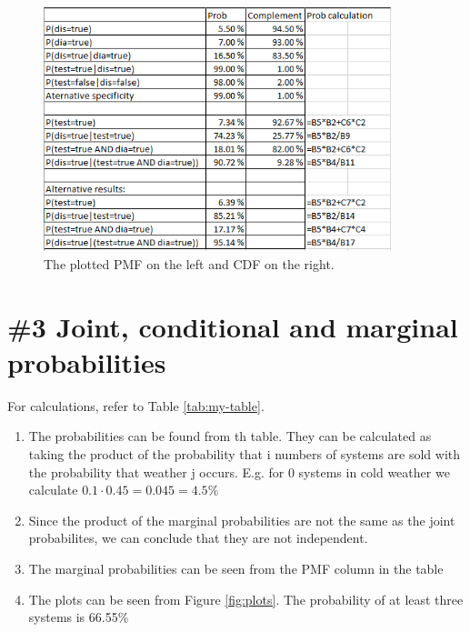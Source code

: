 \documentclass{article}
\begin{document}
\begin{figure}[H]
	\centering
	\includegraphics[width=0.9\textwidth]{calc_2.png}
	\caption{The plotted PMF on the left and CDF on the right.}
	\label{fig:calc_2}
\end{figure}
\section{\#3 Joint, conditional and marginal probabilities}
For calculations, refer to Table \ref{tab:my-table}.

\begin{enumerate}[label=\alph*)]
	\item The probabilities can be found from th table. They can be calculated as taking the product of the probability that i numbers of systems are sold with the probability that weather j occurs. E.g. for 0 systems in cold weather we calculate $0.1 \cdot 0.45=0.045=4.5\%$
	\item Since the product of the marginal probabilities  are not the same as the joint probabilites, we can conclude that they are not independent.
	\item The marginal probabilities can be seen from the PMF column in the table
	\item The plots can be seen from Figure \ref{fig:plots}. The probability of at least three systems is 66.55\%
\end{enumerate}
\end{document}
